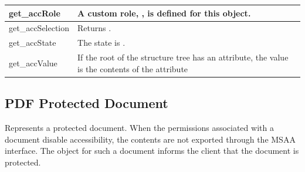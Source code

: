 \documentclass[letterpaper,12pt,english,openany,oneside]{sphinxmanual}
\begin{document}
\begin{savenotes}
\begin{tabulary}{\linewidth}[t]{|T|T|}
\hline
get\_accRole
&
A custom role,  , is defined for this object.
\\
\hline
get\_accSelection
&
Returns  .
\\
\hline
get\_accState
&
The state is  .
\\
\hline
get\_accValue
&
If the root of the structure tree has an  attribute, the value is the contents of the  attribute
\\
\hline
\end{tabulary}
\par
\sphinxattableend\end{savenotes}




\subsection{PDF Protected Document}
\label{\detokenize{MSAA_PDF:pdf-protected-document}}
Represents a protected document. When the permissions associated with a document disable accessibility, the contents are not exported through the MSAA interface. The  object for such a document informs the client that the document is protected.
\end{document}
